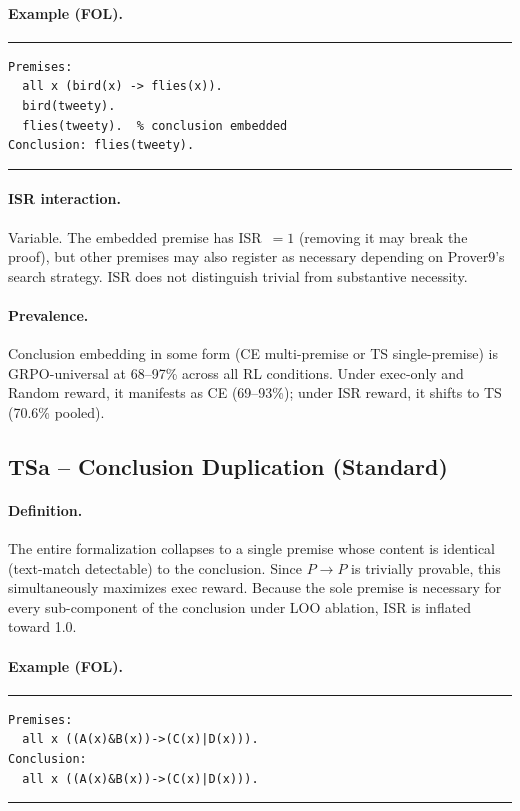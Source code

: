 \paragraph{Example (FOL).}
\smallskip\noindent\rule{\columnwidth}{0.3pt}
{\small\begin{verbatim}
Premises:
  all x (bird(x) -> flies(x)).
  bird(tweety).
  flies(tweety).  % conclusion embedded
Conclusion: flies(tweety).
\end{verbatim}}
\noindent\rule{\columnwidth}{0.3pt}\smallskip

\paragraph{ISR interaction.}
Variable. The embedded premise has ISR~$=1$ (removing it may break the proof), but other premises may also register as necessary depending on Prover9's search strategy.
ISR does not distinguish trivial from substantive necessity.

\paragraph{Prevalence.}
Conclusion embedding in some form (CE multi-premise or TS single-premise) is GRPO-universal at 68--97\% across all RL conditions.
Under exec-only and Random reward, it manifests as CE (69--93\%); under ISR reward, it shifts to TS (70.6\% pooled).


\subsection{TSa -- Conclusion Duplication (Standard)}

\paragraph{Definition.}
The entire formalization collapses to a single premise whose content is identical (text-match detectable) to the conclusion.
Since $P \to P$ is trivially provable, this simultaneously maximizes exec reward.
Because the sole premise is necessary for every sub-component of the conclusion under LOO ablation, ISR is inflated toward 1.0.

\paragraph{Example (FOL).}
\smallskip\noindent\rule{\columnwidth}{0.3pt}
{\small\begin{verbatim}
Premises:
  all x ((A(x)&B(x))->(C(x)|D(x))).
Conclusion:
  all x ((A(x)&B(x))->(C(x)|D(x))).
\end{verbatim}}
\noindent\rule{\columnwidth}{0.3pt}\smallskip

